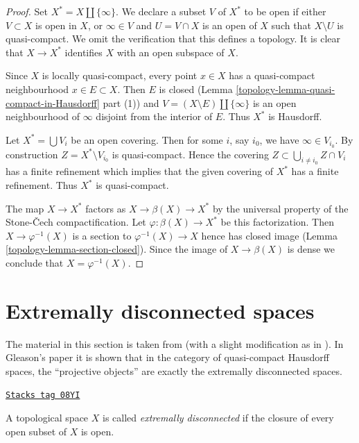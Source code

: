 \begin{proof}

Set $X^* = X \amalg \{\infty\}$. We declare a subset $V$ of $X^*$ to be
open if either $V \subset X$ is open in $X$, or $\infty \in V$ and
$U = V \cap X$ is an open of $X$ such that $X \setminus U$ is quasi-compact.
We omit the verification that this defines a topology. It is clear
that $X \to X^*$ identifies $X$ with an open subspace of $X$.

\medskip\noindent
Since $X$ is locally quasi-compact, every point $x \in X$ has a
quasi-compact neighbourhood $x \in E \subset X$. Then $E$
is closed (Lemma \ref{topology-lemma-quasi-compact-in-Hausdorff} part (1)) and
$V = (X \setminus E) \amalg \{\infty\}$ is an open neighbourhood
of $\infty$ disjoint from the interior of $E$. Thus $X^*$ is Hausdorff.

\medskip\noindent
Let $X^* = \bigcup V_i$ be an open covering. Then for some $i$, say $i_0$,
we have $\infty \in V_{i_0}$. By construction $Z = X^* \setminus V_{i_0}$
is quasi-compact. Hence the covering
$Z \subset \bigcup_{i \not = i_0} Z \cap V_i$ has a finite refinement which
implies that the given covering of $X^*$ has a finite refinement.
Thus $X^*$ is quasi-compact.

\medskip\noindent
The map $X \to X^*$ factors as $X \to \beta(X) \to X^*$ by the universal
property of the Stone-{\v C}ech compactification. Let
$\varphi : \beta(X) \to X^*$ be this factorization.
Then $X \to \varphi^{-1}(X)$ is a section to
$\varphi^{-1}(X) \to X$ hence has closed image
(Lemma \ref{topology-lemma-section-closed}).
Since the image of $X \to \beta(X)$ is dense we conclude that
$X = \varphi^{-1}(X)$.
\end{proof}

\section{Extremally disconnected spaces}
\label{topology-section-extremally-disconnected}
The material in this section is taken from \cite{Gleason}
(with a slight modification as in \cite{Rainwater}).
In Gleason's paper it is shown that in the category of quasi-compact
Hausdorff spaces, the ``projective objects'' are exactly the extremally
disconnected spaces.

\begin{definition}
\label{topology-definition-extremally-disconnected}
\href{https://stacks.math.columbia.edu/tag/08YI}{\texttt{Stacks tag 08YI}}

A topological space $X$ is called {\it extremally disconnected}
if the closure of every open subset of $X$ is open.
\end{definition}


